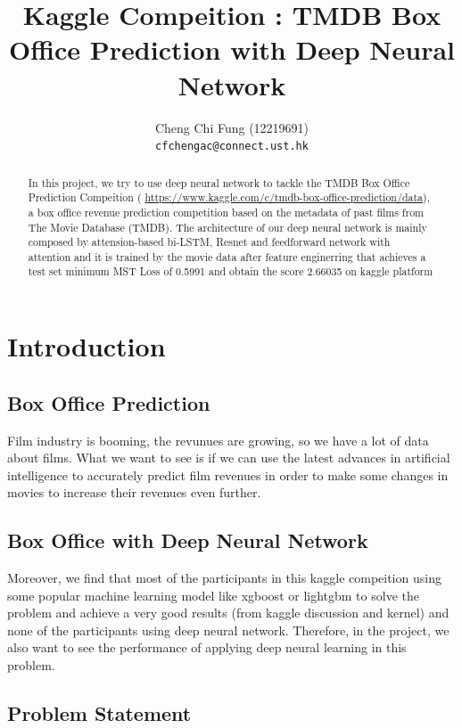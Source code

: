 \documentclass{article}
\title{Kaggle Compeition : TMDB Box Office Prediction with Deep Neural Network}
\author{%
	Cheng Chi Fung (12219691)\\
	\texttt{cfchengac@connect.ust.hk} \\
}
\begin{document}
\maketitle

\begin{abstract}
In this project, we try to use deep neural network to tackle the TMDB Box Office Prediction Compeition ( \url{https://www.kaggle.com/c/tmdb-box-office-prediction/data}), a box office revenue prediction competition based on the metadata of past films from The Movie Database (TMDB). The architecture of our deep neural network is mainly composed by attension-based bi-LSTM, Resnet and feedforward network with attention and it is trained by the movie data after feature enginerring that achieves a test set minimum MST Loss of 0.5991 and obtain the score 2.66035 on kaggle platform
\end{abstract}

\section{Introduction}

\subsection{Box Office Prediction}
Film industry is booming, the revunues are growing, so we have a lot of data about films. What we want to see is if we can use the latest advances in artificial intelligence to accurately predict film revenues in order to make some changes in movies to increase their revenues even further.

\subsection{Box Office with Deep Neural Network} 

Moreover, we find that most of the participants in this kaggle compeition using some popular machine learning model like xgboost or lightgbm to solve the problem and achieve a very good results (from kaggle discussion and kernel) and none of the participants using deep neural network. Therefore, in the project, we also want to see the performance of applying deep neural learning in this problem.

\subsection{Problem Statement}
\end{document}
